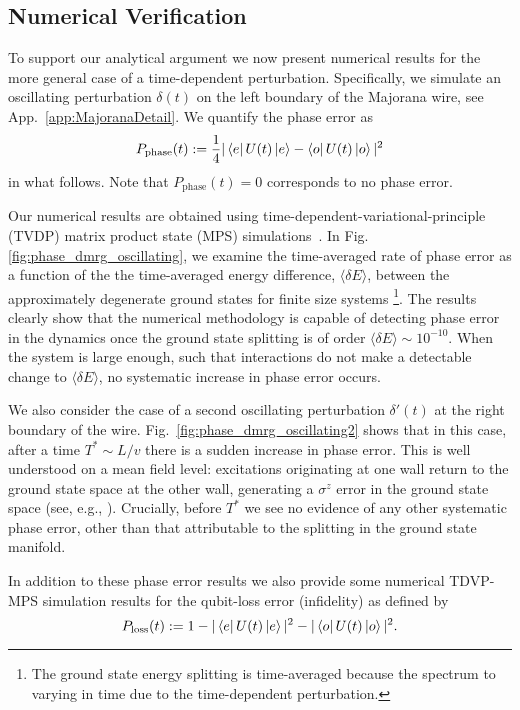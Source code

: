 \documentclass[aps,pra,floatfix,footinbib,longbibliography,twocolumn,superscriptaddress, preprintnumbers, nobibnotes]{revtex4-1}
\begin{document}
\subsection{Numerical Verification} To support our analytical argument we now present numerical results for the more general case of a time-dependent perturbation. Specifically, we simulate an oscillating perturbation $\delta(t)$ on the left boundary of the Majorana wire, see App.~\ref{app:MajoranaDetail}. We quantify the phase error as \begin{equation}P_{\text{phase}}(t) := \frac{1}{4}| \left\langle e\right|U(t)\left|e\right\rangle - \left\langle o\right|U(t)\left|o\right\rangle |^2
\end{equation} in what follows. Note that $P_{\text{phase}}(t)=0$ corresponds to no phase error. 

Our numerical results are obtained using time-dependent-variational-principle (TVDP) matrix product state (MPS) simulations~\cite{HaegemanTDVP,Paeckel2019}. In Fig. \ref{fig:phase_dmrg_oscillating}, we examine the time-averaged rate of phase error as a function of the the time-averaged energy difference, $\langle \delta E \rangle$, between the approximately degenerate ground states for finite size systems \footnote{The ground state energy splitting is time-averaged because the spectrum to varying in time due to the time-dependent perturbation.}. The results clearly show that the numerical methodology is capable of detecting phase error in the dynamics once the ground state splitting is of order $\langle \delta E \rangle\sim 10^{-10}$. When the system is large enough, such that interactions do not make a detectable change to $\langle \delta E \rangle$, no systematic increase in phase error occurs.

We also consider the case of a second oscillating perturbation $\delta'(t)$ at the right boundary of the wire. Fig.~\ref{fig:phase_dmrg_oscillating2} shows that in this case, after a time $T^* \sim L/v$ there is a sudden increase in phase error. This is well understood on a mean field level: excitations originating at one wall return to the ground state space at the other wall, generating a $\sigma^z$ error in the ground state space (see, e.g., \cite{Scheurer2013, Conlon2019}). Crucially, before $T^*$ we see no evidence of any other systematic phase error, other than that attributable to the splitting in the ground state manifold.  

In addition to these phase error results we also provide some numerical TDVP-MPS simulation results for the qubit-loss error (infidelity) as defined by
\begin{equation}
P_{\text{loss}}(t) := 1-| \left\langle e\right|U(t)\left|e\right\rangle|^2 - |\left\langle o\right|U(t)\left|o\right\rangle |^2.
\end{equation}
\end{document}
